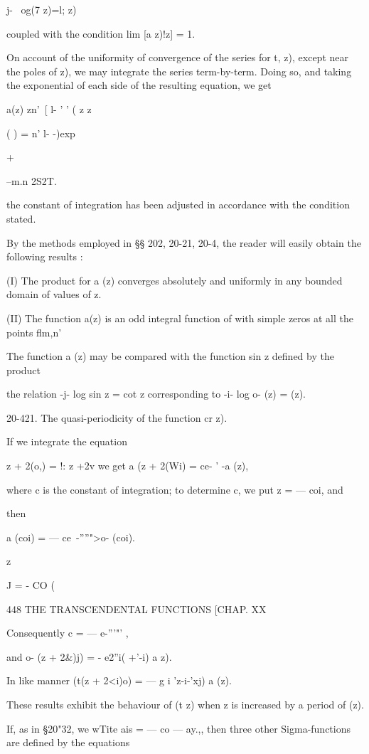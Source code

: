 {j- \ og(7 z)=l; z)

coupled with the condition lim [a z)!z] = 1.

On account of the uniformity of convergence of the series for t, z),
except near the poles of z), we may integrate the series term-by-term.
Doing so, and taking the exponential of each side of the resulting
equation, we get

a(z) zn'\ [ l- ' ' ( z z

( ) = n' l- -)exp

+

--m.n 2S2T.

the constant of integration has been adjusted in accordance with the
condition stated.

By the methods employed in §§ 202, 20-21, 20-4, the reader will easily
obtain the following results :

(I) The product for a (z) converges absolutely and uniformly in any
bounded domain of values of z.

(II) The function a(z) is an odd integral function of with simple
zeros at all the points flm,n'

The function a (z) may be compared with the function sin z defined by
the product

the relation -j- log sin z = cot z corresponding to -i- log o- (z) =
(z).

20-421. The quasi-periodicity of the function cr z).

If we integrate the equation

  z + 2(o,) = !: z +2v we get a (z + 2(Wi) = ce- ' -a (z),

where c is the constant of integration; to determine c, we put z = —
coi, and

then

a (coi) = — ce~-''''">o- (coi).

z

J = - CO (\

448 THE TRANSCENDENTAL FUNCTIONS [CHAP. XX

Consequently c = — e-'''"' ,

and o- (z + 2\&)j) = - e2''i( +'-i) a z).

In like manner (t(z + 2<i)o) = — g i 'z-i-'xj) a (z).

These results exhibit the behaviour of (t z) when z is increased by a
period of (z).

If, as in §20"32, we wTite ais = — co — ay.,, then three other
Sigma-functions are defined by the equations

}
